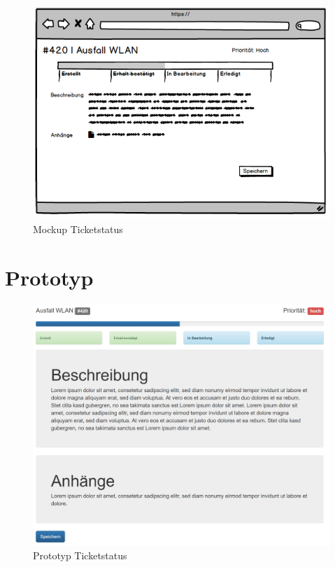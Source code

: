 \vspace{.5cm}
\begin{figure}[h]
	\centering
	\includegraphics[scale=0.582]{figures/Wireframe_Ticket.png}
	\caption{Mockup Ticketstatus}
	\label{Abb_Mockup_Ticketstatus}
\end{figure}	

\newpage
\section{Prototyp}
\begin{figure}[h]
	\centering
	\includegraphics[scale=.5]{figures/Prototyp.png}
	\caption{Prototyp Ticketstatus}
	\label{Abb_Prototyp_Ticketstatus}
\end{figure}

